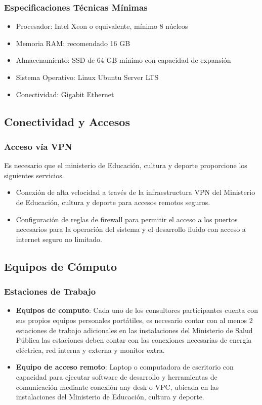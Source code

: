 \subsubsection{Especificaciones Técnicas Mínimas}
\begin{itemize}
    \item Procesador: Intel Xeon o equivalente, mínimo 8 núcleos
    \item Memoria RAM: recomendado 16 GB
    \item Almacenamiento: SSD de 64 GB mínimo con capacidad de expansión
    \item Sistema Operativo: Linux Ubuntu Server LTS
    \item Conectividad: Gigabit Ethernet
\end{itemize}

\subsection{Conectividad y Accesos}
\subsubsection{Acceso vía VPN}
Es necesario que el ministerio de Educación, cultura y deporte proporcione los siguientes servicios.
\begin{itemize}
    \item Conexión de alta velocidad a través de la infraestructura VPN del Ministerio de Educación, cultura y deporte para accesos remotos seguros.
    \item Configuración de reglas de firewall para permitir el acceso a los puertos necesarios para la operación del sistema y el desarrollo fluido con acceso a internet seguro no limitado.
\end{itemize}

\subsection{Equipos de Cómputo}

\subsubsection{Estaciones de Trabajo}
\begin{itemize}
    \item \textbf{Equipos de computo}: 
    Cada uno de los consultores participantes cuenta con sus propios equipos personales portátiles, es necesario contar con al menos 2 estaciones de trabajo adicionales en las instalaciones del Ministerio de Salud Pública las estaciones deben contar con las conexiones necesarias de energia eléctrica, red interna y externa y monitor extra.
    \item \textbf{Equipo de acceso remoto}: Laptop o computadora de escritorio con capacidad para ejecutar software de desarrollo y herramientas de comunicación mediante conexión any desk o VPC, ubicada en las instalaciones del Ministerio de Educación, cultura y deporte.
\end{itemize}


